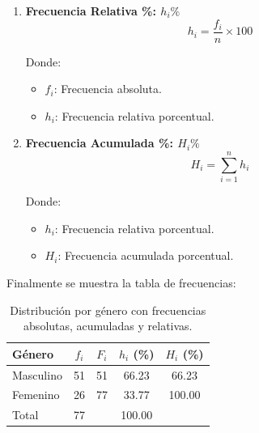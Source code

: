 \documentclass{article}
\begin{document}
\begin{multicols}{2}
\begin{enumerate}
    \item \begin{center}
      \textbf{Frecuencia Relativa \%: $h_i\%$}
      \hrulefill
      \begin{equation*}
        h_i = \frac{f_i}{n} \times 100
      \end{equation*}
    \end{center}
    \vspace{-1cm}
    Donde:
    \begin{itemize}
        \item $f_i$: Frecuencia absoluta.
        \item $h_i$: Frecuencia relativa porcentual.
    \end{itemize}

    \item \begin{center}
      \textbf{Frecuencia Acumulada \%: $H_i\%$}
      \hrulefill
      \begin{equation*}
        H_i = \sum_{i=1}^{n} h_i
      \end{equation*}
    \end{center}
    \vspace{-1cm}
    Donde:
    \begin{itemize}
        \item $h_i$: Frecuencia relativa porcentual.
        \item $H_i$: Frecuencia acumulada porcentual.
    \end{itemize}
    \end{enumerate}
  \end{multicols}
  \vspace{-0.5cm}
  Finalmente se muestra la tabla de frecuencias:

  \renewcommand{\arraystretch}{1.5} %
\begin{table}[ht]
    \centering
    \begin{tabular}{l @{\hskip 0.5cm} c @{\hskip 0.5cm} c @{\hskip 0.5cm} c @{\hskip 0.5cm} c}
      \hline
      \textbf{Género} & \textbf{$f_i$} & \textbf{$F_i$} & \textbf{$h_i$ (\%)} & \textbf{$H_i$ (\%)} \\ \hline
      Masculino       & 51             & 51             & 66.23               & 66.23               \\ \hline
      Femenino        & 26             & 77             & 33.77               & 100.00              \\ \hline
      Total           & 77             &                & 100.00              &                     \\
    \end{tabular}
    \caption{Distribución por género con frecuencias absolutas, acumuladas y relativas.}
    \label{tab:genero-frecuencias}
\end{table}
\end{document}
